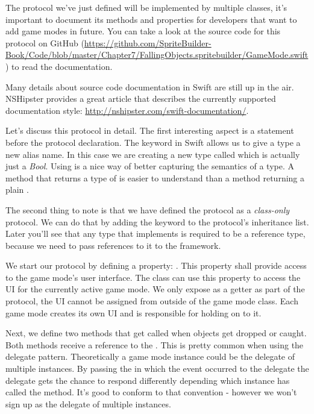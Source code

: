 The protocol we've just defined will be implemented by
multiple classes, it's important to document its methods and properties for developers that want
to add game modes in future. You can take a look at the source code for
this protocol on
GitHub
(\url{https://github.com/SpriteBuilder-Book/Code/blob/master/Chapter7/FallingObjects.spritebuilder/GameMode.swift}) to read the documentation.

\begin{details} Many details about source code documentation in Swift are still up in the air.
NSHipster provides a great article that describes the currently supported
documentation style: \url{http://nshipster.com/swift-documentation/}.
\end{details}

Let's discuss this protocol in detail. The first interesting aspect is a
 statement before the protocol declaration. The
 keyword in Swift allows us to give a type a new alias
name. In this case we are creating a new type called  which
is actually just a \textit{Bool}. Using  is a nice way
of better capturing the semantics of a type. A method that returns a
type of  is easier to understand than a method returning a
plain .

The second thing to note is that we
have defined the protocol as a \textit{class-only} protocol. We can do that by
adding the  keyword to the protocol's inheritance list. Later
you'll see that any type that implements  is
required to be a reference type, because we need to pass references to it to the
\cocos{} framework. 

We start our protocol by defining a property: . This
property shall provide access to the game mode's user interface. The
 class can use this property to access the UI for the
currently active game mode.
We only expose as a getter as part of the protocol, the UI cannot be assigned
from outside of the game mode class. Each game mode creates its own UI and is
responsible for holding on to it.

Next, we define two methods that get called when objects get dropped or caught.
Both methods receive a reference to the . This is pretty
common when using the delegate pattern. Theoretically a game mode instance
could be the delegate of multiple  instances. By passing
the  in which the event occurred to the delegate the
delegate gets the chance to respond differently depending which instance has
called the method. It's good to conform to that convention - however we won't
sign up as the delegate of multiple  instances.

